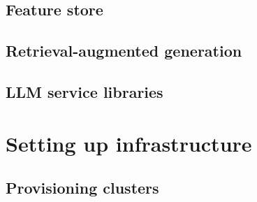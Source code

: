 \subsection{Feature store}
\subsection{Retrieval-augmented generation}
\subsection{LLM service libraries}

\section{Setting up infrastructure}
\subsection{Provisioning clusters}
